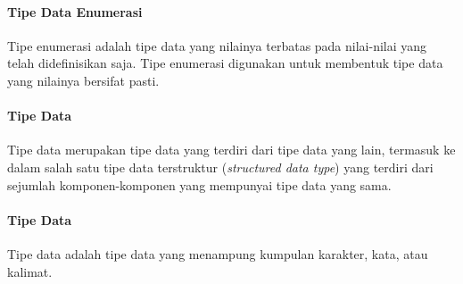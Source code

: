 \documentclass[../main.tex]{subfiles}
\begin{document}
    \paragraph{Tipe Data Enumerasi}
    \begin{indentlevel1}
        Tipe enumerasi adalah tipe data yang nilainya terbatas pada nilai-nilai yang telah didefinisikan saja. Tipe enumerasi digunakan untuk membentuk tipe data yang nilainya bersifat pasti.
    \end{indentlevel1}

    \paragraph{Tipe Data {\sArray}}
    \begin{indentlevel1}
        Tipe data {\sarray} merupakan tipe data yang terdiri dari tipe data yang lain, termasuk ke dalam salah satu tipe data terstruktur (\textit{structured data type}) yang terdiri dari sejumlah komponen-komponen yang mempunyai tipe data yang sama.
    \end{indentlevel1}

    \paragraph{Tipe Data {\sString}}
    \begin{indentlevel1}
        Tipe data {\sstring} adalah tipe data yang menampung kumpulan karakter, kata, atau kalimat.
    \end{indentlevel1}
\end{document}
